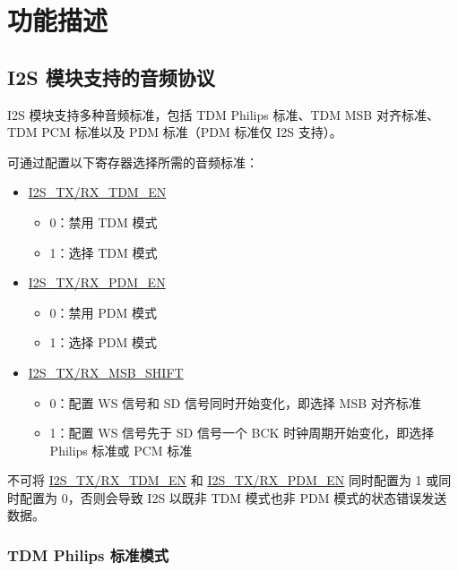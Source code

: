 \documentclass[main\_\_CN.tex]{subfiles}
\begin{document}
\section{功能描述}
\label{sec:i2s-func-descr}

\subsection{I2S 模块支持的音频协议} \label{sec:i2s-supported-audio-standards}

\chipname{} I2S 模块支持多种音频标准，包括 TDM Philips 标准、TDM MSB 对齐标准、TDM PCM 标准以及 PDM 标准（PDM 标准仅 I2S 支持）。

可通过配置以下寄存器选择所需的音频标准：

\begin{itemize}
    \item \hyperref[fielddesc:I2SRXTDMEN]{I2S\_TX/RX\_TDM\_EN}
    \begin{itemize}
        \item 0：禁用 TDM 模式
        \item 1：选择 TDM 模式
    \end{itemize}
    \item \hyperref[fielddesc:I2SRXPDMEN]{I2S\_TX/RX\_PDM\_EN}
    \begin{itemize}
        \item 0：禁用 PDM 模式
        \item 1：选择 PDM 模式
    \end{itemize}    
    \item \hyperref[fielddesc:I2SRXMSBSHIFT]{I2S\_TX/RX\_MSB\_SHIFT}
    \begin{itemize}
        \item 0：配置 WS 信号和 SD 信号同时开始变化，即选择 MSB 对齐标准
        \item 1：配置 WS 信号先于 SD 信号一个 BCK 时钟周期开始变化，即选择 Philips 标准或 PCM 标准
    \end{itemize}
\end{itemize}

\begin{tiplisting}
不可将 \hyperref[fielddesc:I2SRXTDMEN]{I2S\_TX/RX\_TDM\_EN} 和 \hyperref[fielddesc:I2SRXPDMEN]{I2S\_TX/RX\_PDM\_EN} 同时配置为 1 或同时配置为 0，否则会导致 \chipname{} I2S 以既非 TDM 模式也非 PDM 模式的状态错误发送数据。
\end{tiplisting}

\subsubsection{TDM Philips 标准模式}
\end{document}
